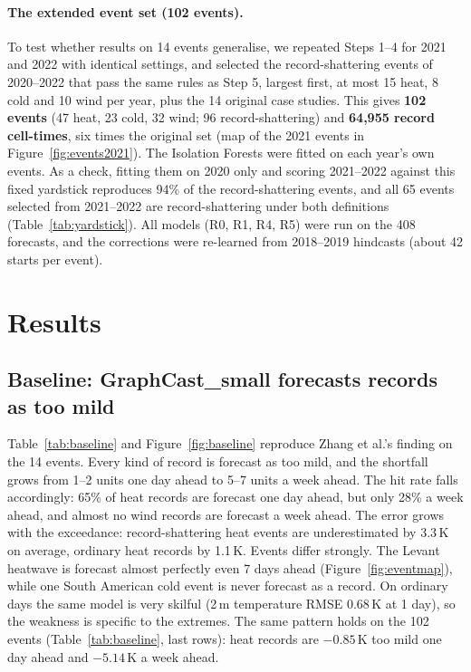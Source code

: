 \documentclass{article}
\newcommand{\R}[1]{\textsf{R#1}}
\begin{document}
\paragraph{The extended event set (102 events).}
\label{sec:ext-method}
To test whether results on 14 events generalise, we repeated Steps 1--4 for 2021 and 2022 with identical settings, and selected the record-shattering events of
2020--2022 that pass the same rules as Step 5, largest first, at most 15 heat, 8 cold and 10 wind per year, plus the 14 original case studies.
This gives \textbf{102 events} (47 heat, 23 cold, 32 wind; 96 record-shattering) and \textbf{64{,}955 record cell-times}, six times the original set
(map of the 2021 events in Figure~\ref{fig:events2021}). The Isolation Forests were fitted on each year's own events. As a check, fitting them on 2020 only and scoring
2021--2022 against this fixed yardstick reproduces 94\% of the record-shattering events, and all 65 events selected from 2021--2022 are record-shattering under both
definitions (Table~\ref{tab:yardstick}). All models (\R{0}, \R{1}, \R{4}, \R{5}) were run on the 408 forecasts, and the corrections were re-learned from
2018--2019 hindcasts (about 42 starts per event).

\section{Results}
\label{sec:results}

\subsection{Baseline: GraphCast\_small forecasts records as too mild}
\label{sec:res-base}
Table~\ref{tab:baseline} and Figure~\ref{fig:baseline} reproduce Zhang et al.'s finding on the 14 events. Every kind of record is forecast as too
mild, and the shortfall grows from 1--2 units one day ahead to 5--7 units a week ahead. The hit rate falls accordingly: 65\% of heat records are
forecast one day ahead, but only 28\% a week ahead, and almost no wind records are forecast a week ahead. The error grows with the exceedance:
record-shattering heat events are underestimated by 3.3\,K on average, ordinary heat records by 1.1\,K. Events differ strongly. The Levant heatwave is
forecast almost perfectly even 7 days ahead (Figure~\ref{fig:eventmap}), while one South American cold event is never forecast as a record.
On ordinary days the same model is very skilful (2\,m temperature RMSE 0.68\,K at 1 day), so the weakness is specific to the extremes.
The same pattern holds on the 102 events (Table~\ref{tab:baseline}, last rows): heat records are $-0.85$\,K too mild one day ahead and $-5.14$\,K a week ahead.
\end{document}
